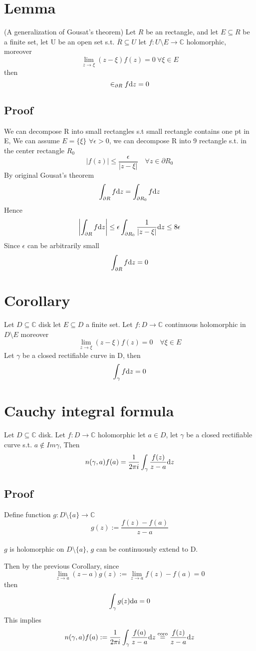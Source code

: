 \documentclass{book}
\newcommand{\abs}[1]{\left\lvert #1 \right\rvert}
\begin{document}
\section{Lemma}
(A generalization of Gousat's theorem)
Let $R$ be an rectangle, and let $E\subseteq R$ be a finite set, let U be an open set s.t. $\overline R\subseteq U$ let $f:U\setminus E\to \mathbb C$ holomorphic, moreover$$\lim\limits_{z\to \xi}(z-\xi)f(z)=0\ \forall \xi\in E$$ then$$\in_{\partial R}f\text dz=0$$
\subsection{Proof}
We can decompose R into small rectangles s.t small rectangle contains one pt in E, We can assume $E=\{\xi\}$ $\forall \epsilon>0$, we can decompose R into 9 rectangle s.t. in the center rectangle $R_0$$$\abs{f(z)}\leq\frac{\epsilon}{\abs{z-\xi}}\quad\forall z\in \partial R_0$$ 
By original Gousat's theorem$$\int_{\partial R}f\text dz=\int_{\partial R_0}f\text dz$$
Hence$$\abs{\int_{\partial R}f\text dz}\leq\epsilon\int_{\partial R_0}\frac{1}{\abs{z-\xi}}\text dz\leq 8\epsilon$$
Since $\epsilon$ can be arbitrarily small$$\int_{\partial R}f\text dz=0$$
\section{Corollary}
Let $D\subseteq\mathbb C$ disk let $E\subseteq D$ a finite set. Let $f:D\to \mathbb C$ continuous holomorphic in $D\setminus E$ moreover$$\lim\limits_{z\to \xi}(z-\xi)f(z)=0\quad\forall \xi \in E$$
Let $\gamma $ be a closed rectifiable curve in D, then $$\int_\gamma f\text dz=0$$
\section{Cauchy integral formula}
Let $D\subseteq \mathbb C$ disk. Let $f:D\to \mathbb C$ holomorphic let $a\in D$, let $\gamma$ be a closed rectifiable curve s.t. $a\notin Im\gamma$, Then $$n(\gamma,a)f(a)=\frac{1}{2\pi i}\int_\gamma\frac{f(z)}{z-a}\text dz$$
\subsection*{Proof}
Define function $g:D\setminus\{a\}\to \mathbb C$$$g(z):=\frac{f(z)-f(a)}{z-a}$$\\
$g$ is holomorphic on $D\setminus\{a\}$, $g$ can be continuously extend to D.

Then by the previous Corollary, since $$\lim\limits_{z\to a}(z-a)g(z):=\lim\limits_{z\to a}f(z)-f(a)=0$$then$$\int_\gamma g(z)\text da=0$$
This implies$$n(\gamma,a)f(a):=\frac{1}{2\pi i}\int_\gamma\frac{f(a)}{z-a}\text dz\stackrel{\text{coro}}{=}\frac{f(z)}{z-a}\text dz$$
\end{document}

